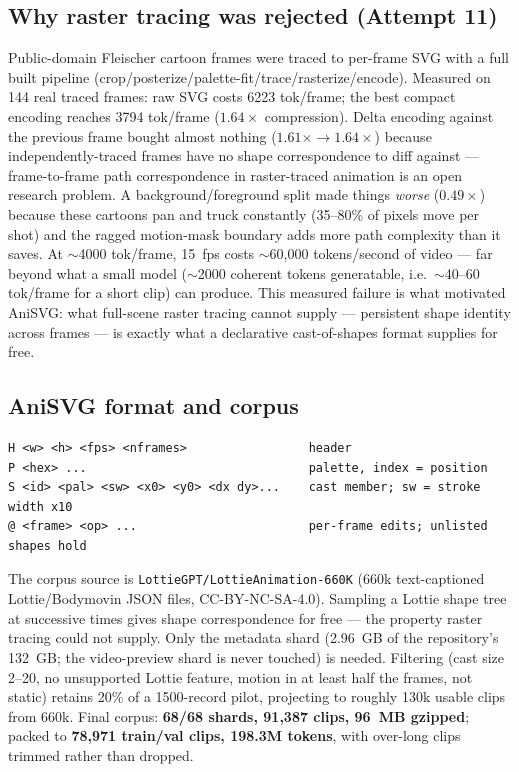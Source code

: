 \documentclass[11pt]{article}
\begin{document}
\subsection{Why raster tracing was rejected (Attempt 11)}
\label{sec:raster}

Public-domain Fleischer cartoon frames were traced to per-frame SVG with a
full built pipeline (crop/posterize/palette-fit/trace/rasterize/encode).
Measured on 144 real traced frames: raw SVG costs 6223 tok/frame; the best
compact encoding reaches 3794 tok/frame ($1.64\times$ compression). Delta
encoding against the previous frame bought almost nothing ($1.61\times
\rightarrow 1.64\times$) because independently-traced frames have no shape
correspondence to diff against --- frame-to-frame path correspondence in
raster-traced animation is an open research problem. A
background/foreground split made things \emph{worse} ($0.49\times$)
because these cartoons pan and truck constantly (35--80\% of pixels move
per shot) and the ragged motion-mask boundary adds more path complexity
than it saves. At $\sim$4000 tok/frame, 15~fps costs $\sim$60{,}000
tokens/second of video --- far beyond what a small model ($\sim$2000
coherent tokens generatable, i.e.\ $\sim$40--60 tok/frame for a short
clip) can produce. This measured failure is what motivated AniSVG: what
full-scene raster tracing cannot supply --- persistent shape identity
across frames --- is exactly what a declarative cast-of-shapes format
supplies for free.

\subsection{AniSVG format and corpus}
\label{sec:anisvg}

\begin{verbatim}
H <w> <h> <fps> <nframes>                 header
P <hex> ...                               palette, index = position
S <id> <pal> <sw> <x0> <y0> <dx dy>...    cast member; sw = stroke width x10
@ <frame> <op> ...                        per-frame edits; unlisted shapes hold
\end{verbatim}

The corpus source is \texttt{LottieGPT/LottieAnimation-660K} (660k
text-captioned Lottie/Bodymovin JSON files, CC-BY-NC-SA-4.0). Sampling a
Lottie shape tree at successive times gives shape correspondence for free
--- the property raster tracing could not supply. Only the metadata shard
(2.96~GB of the repository's 132~GB; the video-preview shard is never
touched) is needed. Filtering (cast size 2--20, no unsupported Lottie
feature, motion in at least half the frames, not static) retains 20\% of
a 1500-record pilot, projecting to roughly 130k usable clips from 660k.
Final corpus: \textbf{68/68 shards, 91{,}387 clips, 96~MB gzipped}; packed
to \textbf{78{,}971 train/val clips, 198.3M tokens}, with over-long clips
trimmed rather than dropped.
\end{document}
